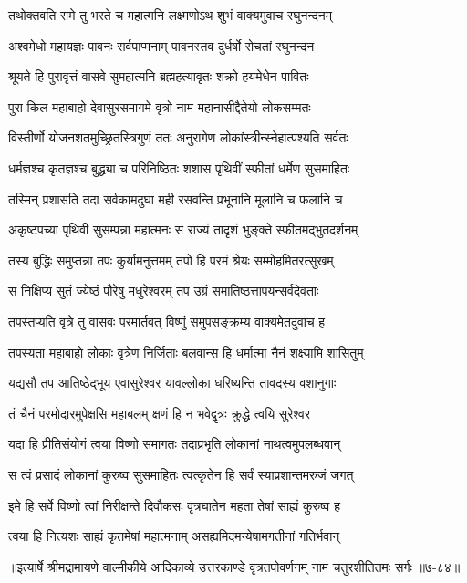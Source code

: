 
\twolineshloka
{तथोक्तवति रामे तु भरते च महात्मनि}
{लक्ष्मणोऽथ शुभं वाक्यमुवाच रघुनन्दनम्} %

\twolineshloka
{अश्वमेधो महायज्ञः पावनः सर्वपाप्मनाम्}
{पावनस्तव दुर्धर्षो रोचतां रघुनन्दन} %

\twolineshloka
{श्रूयते हि पुरावृत्तं वासवे सुमहात्मनि}
{ब्रह्महत्यावृतः शक्रो हयमेधेन पावितः} %

\twolineshloka
{पुरा किल महाबाहो देवासुरसमागमे}
{वृत्रो नाम महानासीद्दैतेयो लोकसम्मतः} %

\twolineshloka
{विस्तीर्णो योजनशतमुच्छ्रितस्त्रिगुणं ततः}
{अनुरागेण लोकांस्त्रीन्स्नेहात्पश्यति सर्वतः} %

\twolineshloka
{धर्मज्ञश्च कृतज्ञश्च बुद्ध्या च परिनिष्ठितः}
{शशास पृथिवीं स्फीतां धर्मेण सुसमाहितः} %

\twolineshloka
{तस्मिन् प्रशासति तदा सर्वकामदुघा मही}
{रसवन्ति प्रभूनानि मूलानि च फलानि च} %

\twolineshloka
{अकृष्टपच्या पृथिवी सुसम्पन्ना महात्मनः}
{स राज्यं तादृशं भुङ्क्ते स्फीतमद्भुतदर्शनम्} %

\twolineshloka
{तस्य बुद्धिः समुप्तन्ना तपः कुर्यामनुत्तमम्}
{तपो हि परमं श्रेयः सम्मोहमितरत्सुखम्} %

\twolineshloka
{स निक्षिप्य सुतं ज्येष्ठं पौरेषु मधुरेश्वरम्}
{तप उग्रं समातिष्ठत्तापयन्सर्वदेवताः} %

\twolineshloka
{तपस्तप्यति वृत्रे तु वासवः परमार्तवत्}
{विष्णुं समुपसङ्क्रम्य वाक्यमेतदुवाच ह} %

\twolineshloka
{तपस्यता महाबाहो लोकाः वृत्रेण निर्जिताः}
{बलवान्स हि धर्मात्मा नैनं शक्ष्यामि शासितुम्} %

\twolineshloka
{यद्यसौ तप आतिष्ठेद्भूय एवासुरेश्वर}
{यावल्लोका धरिष्यन्ति तावदस्य वशानुगाः} %

\twolineshloka
{तं चैनं परमोदारमुपेक्षसि महाबलम्}
{क्षणं हि न भवेद्वृत्रः क्रुद्धे त्वयि सुरेश्वर} %

\twolineshloka
{यदा हि प्रीतिसंयोगं त्वया विष्णो समागतः}
{तदाप्रभृति लोकानां नाथत्वमुपलब्धवान्} %

\twolineshloka
{स त्वं प्रसादं लोकानां कुरुष्व सुसमाहितः}
{त्वत्कृतेन हि सर्वं स्याप्रशान्तमरुजं जगत्} %

\twolineshloka
{इमे हि सर्वे विष्णो त्वां निरीक्षन्ते दिवौकसः}
{वृत्रघातेन महता तेषां साह्यं कुरुष्व ह} %

\twolineshloka
{त्वया हि नित्यशः साह्यं कृतमेषां महात्मनाम्}
{असह्यमिदमन्येषामगतीनां गतिर्भवान्} %


॥इत्यार्षे श्रीमद्रामायणे वाल्मीकीये आदिकाव्ये उत्तरकाण्डे वृत्रतपोवर्णनम् नाम चतुरशीतितमः सर्गः ॥७-८४॥
